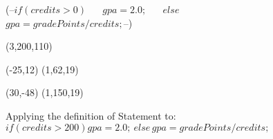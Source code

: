 




\begin {figure}

\Draw


\Text (--$if (credits > 0)$ \hfill	~~
       \hfill$gpa = 2.0;$ \hspace{70pt}~~
       $else$\hfill			~~
       \hfill\hspace{5pt} $gpa = gradePoints / credits;$--)

\simpleBox(3,200,110)

\Move(-25,12)
\simpleBox(1,62,19)

\Move(30,-48)
\simpleBox(1,150,19)

\EndDraw

\caption {Applying the definition of 
Statement to: \newline
$if (credits > 200) gpa = 2.0;  \
else \hspace{2pt} gpa = gradePoints / credits; $
}

\label {fig:ifElseStmt}

\end {figure}


